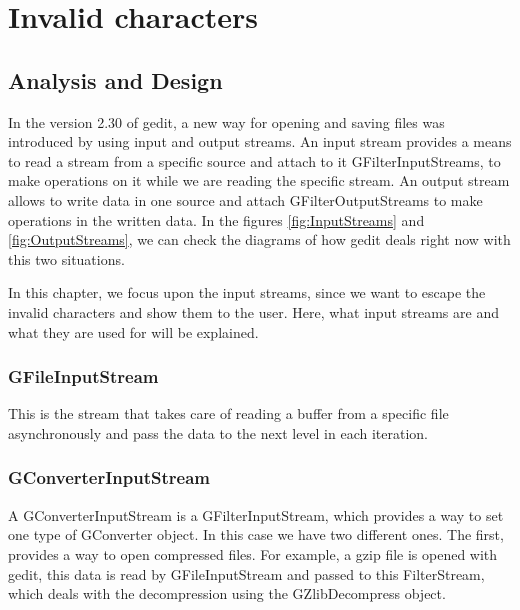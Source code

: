 \chapter{Invalid characters}\label{chap:InvalidChars}

\section{Analysis and Design}

In the version 2.30 of gedit, a new way for opening and saving files was introduced by using input and output streams. An input stream provides a means to read a stream from a specific source and attach to it GFilterInputStreams, to make operations on it while we are reading the specific stream. An output stream allows to write data in one source and attach GFilterOutputStreams to make operations in the written data. In the figures \ref{fig:InputStreams} and \ref{fig:OutputStreams}, we can check the diagrams of how gedit deals right now with this two situations.



In this chapter, we focus upon the input streams, since we want to escape the invalid characters and show them to the user. Here,
what input streams are and what they are used for will be explained.


\subsection*{GFileInputStream}

This is the stream that takes care of reading a buffer from a specific file asynchronously and pass the data to the next level in each iteration.

\subsection*{GConverterInputStream}

A GConverterInputStream is a GFilterInputStream, which provides a way to set one type of GConverter object. In this case we have two different ones. The first, provides a way to open compressed files. For example,  a gzip file is opened with gedit, this data is read by GFileInputStream and passed to this FilterStream,  which deals with the decompression using the GZlibDecompress object.

